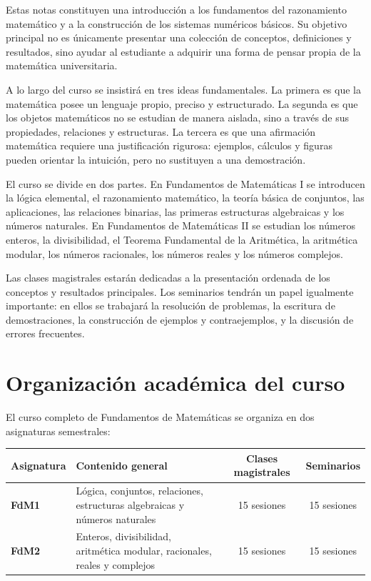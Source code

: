 \documentclass[11pt,a4paper,openany]{book}
\begin{document}
Estas notas constituyen una introducción a los fundamentos del razonamiento matemático y a la construcción de los sistemas numéricos básicos. Su objetivo principal no es únicamente presentar una colección de conceptos, definiciones y resultados, sino ayudar al estudiante a adquirir una forma de pensar propia de la matemática universitaria.

A lo largo del curso se insistirá en tres ideas fundamentales. La primera es que la matemática posee un lenguaje propio, preciso y estructurado. La segunda es que los objetos matemáticos no se estudian de manera aislada, sino a través de sus propiedades, relaciones y estructuras. La tercera es que una afirmación matemática requiere una justificación rigurosa: ejemplos, cálculos y figuras pueden orientar la intuición, pero no sustituyen a una demostración.

El curso se divide en dos partes. En Fundamentos de Matemáticas I se introducen la lógica elemental, el razonamiento matemático, la teoría básica de conjuntos, las aplicaciones, las relaciones binarias, las primeras estructuras algebraicas y los números naturales. En Fundamentos de Matemáticas II se estudian los números enteros, la divisibilidad, el Teorema Fundamental de la Aritmética, la aritmética modular, los números racionales, los números reales y los números complejos.

Las clases magistrales estarán dedicadas a la presentación ordenada de los conceptos y resultados principales. Los seminarios tendrán un papel igualmente importante: en ellos se trabajará la resolución de problemas, la escritura de demostraciones, la construcción de ejemplos y contraejemplos, y la discusión de errores frecuentes.

\tableofcontents

\chapter*{Organización académica del curso}

El curso completo de Fundamentos de Matemáticas se organiza en dos asignaturas semestrales:

\begin{center}
\begin{tabularx}{0.95\textwidth}{>{\bfseries}l X c c}
\toprule
Asignatura & Contenido general & Clases magistrales & Seminarios \\
\midrule
FdM1 & Lógica, conjuntos, relaciones, estructuras algebraicas y números naturales & 15 sesiones & 15 sesiones \\
FdM2 & Enteros, divisibilidad, aritmética modular, racionales, reales y complejos & 15 sesiones & 15 sesiones \\
\bottomrule
\end{tabularx}
\end{center}
\end{document}
